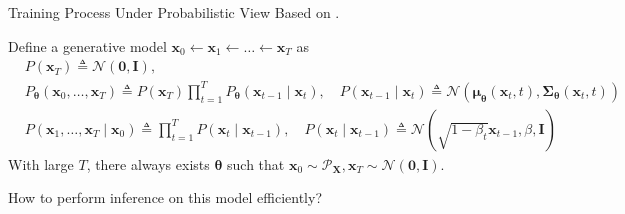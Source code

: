 \documentclass[10pt,xcolor={usenames,dvipsnames,table},aspectratio=169]{beamer}
\begin{document}
\begin{frame}{Training Process Under Probabilistic View}
Based on .

Define a generative model $\bm{x}_0 \leftarrow \bm{x}_1 \leftarrow \ldots  \leftarrow \bm{x}_T$ as
\begin{align}
&P(\bm{x}_T) \triangleq \mathcal{N}(\bm{0}, \bm{I}), \\
&P_{\boldsymbol \theta}(\bm{x}_0, \ldots , \bm{x}_T) \triangleq P(\bm{x}_T) \prod_{t=1}^{T} P_{\boldsymbol \theta}(\bm{x}_{t-1} \mid \bm{x}_t), \quad P(\bm{x}_{t-1} \mid \bm{x}_{t}) \triangleq \mathcal{N}(\boldsymbol \mu_{\boldsymbol \theta}(\bm{x}_t, t), \boldsymbol \Sigma_{\boldsymbol \theta}(\bm{x}_t, t)) \\
&P(\bm{x}_1, \ldots , \bm{x}_T \mid \bm{x}_0)  \triangleq \prod_{t=1}^{T} P(\bm{x}_t \mid \bm{x}_{t-1}), \quad P(\bm{x}_t \mid \bm{x}_{t-1}) \triangleq \mathcal{N}(\sqrt{1- \beta_t} \bm{x}_{t-1}, \beta, \bm{I})
\end{align}
With large $T$, there always exists $\boldsymbol \theta$ such that $\bm{x}_0 \sim \mathcal{P}_{\bm{X}}, \bm{x}_T \sim \mathcal{N}(\bm{0}, \bm{I})$.

How to perform inference on this model efficiently?
\end{frame}
\end{document}
